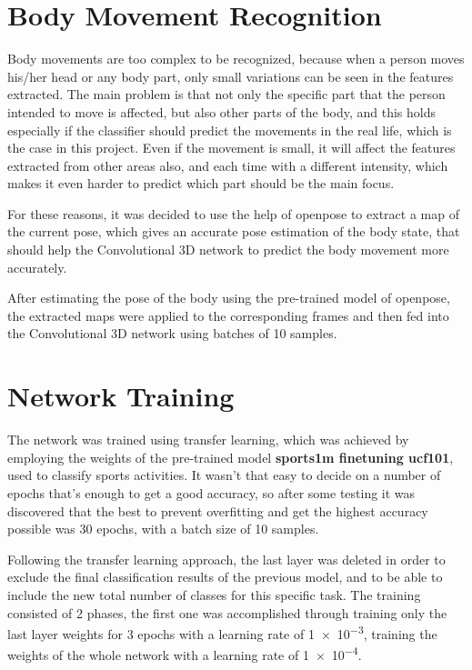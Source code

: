 \documentclass{article}
\begin{document}

\section{Body Movement Recognition}

Body movements are too complex to be recognized, because when a person moves his/her head or any body part, only small variations can be seen in the features extracted. The main problem is that not only the specific part that the person intended to move is affected, but also other parts of the body, and this holds especially if the classifier should predict the movements in the real life, which is the case in this project. Even if the movement is small, it will affect the features extracted from other areas also, and each time with a different intensity, which makes it even harder to predict which part should be the main focus. 

For these reasons, it was decided to use the help of openpose to extract a map of the current pose, which gives an accurate pose estimation of the body state, that should help the Convolutional 3D network to predict the body movement more accurately. 

After estimating the pose of the body using the pre-trained model of openpose, the extracted maps were applied to the corresponding frames and then fed into the Convolutional 3D network using batches of 10 samples.



\section{Network Training}

The network was trained using transfer learning, which was achieved by employing the weights of the pre-trained model \textbf{sports1m finetuning ucf101}, used to classify sports activities. It wasn't that easy to decide on a number of epochs that's enough to get a good accuracy, so after some testing it was discovered that the best to prevent overfitting and get the highest accuracy possible was 30 epochs, with a batch size of 10 samples. 

Following the transfer learning approach, the last layer was deleted in order to exclude the final classification results of the previous model, and to be able to include the new total number of classes for this specific task. The training consisted of 2 phases, the first one was accomplished through  training only the last layer weights for 3 epochs with a learning rate of \num[math-rm=\mathbf]{1e-3},  training the weights of the whole network with a learning rate of \num[math-rm=\mathbf]{1e-4}.
\end{document}
